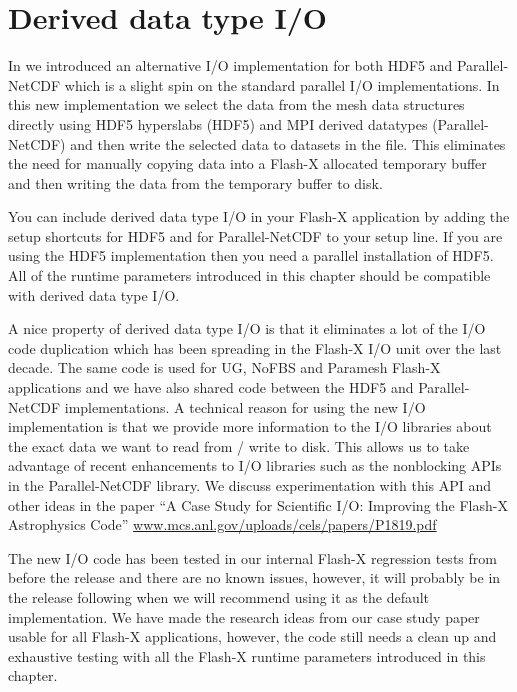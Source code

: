 \section{Derived data type I/O}

In \flashx we introduced an alternative I/O implementation for
both HDF5 and Parallel-NetCDF which is a slight spin on the standard
parallel I/O implementations.  In this new implementation we select
the data from the mesh data structures directly using HDF5 hyperslabs
(HDF5) and MPI derived datatypes (Parallel-NetCDF) and then write the
selected data to datasets in the file.  This eliminates the need for
manually copying data into a Flash-X allocated temporary buffer and then
writing the data from the temporary buffer to disk.

You can include derived data type I/O in your Flash-X application by
adding the setup shortcuts  for HDF5 and
 for Parallel-NetCDF to your setup line.  If you are
using the HDF5 implementation then you need a parallel installation of
HDF5.  All of the runtime parameters introduced in this chapter should
be compatible with derived data type I/O.

A nice property of derived data type I/O is that it eliminates a lot
of the I/O code duplication which has been spreading in the Flash-X I/O
unit over the last decade.  The same code is used for UG, NoFBS and
Paramesh Flash-X applications and we have also shared code between the
HDF5 and Parallel-NetCDF implementations.  A technical reason for
using the new I/O implementation is that we provide more information
to the I/O libraries about the exact data we want to read from / write
to disk.  This allows us to take advantage of recent enhancements to
I/O libraries such as the nonblocking APIs in the Parallel-NetCDF
library.  We discuss experimentation with this API and other ideas in
the paper ``A Case Study for Scientific I/O: Improving the Flash-X
Astrophysics Code''
\url{www.mcs.anl.gov/uploads/cels/papers/P1819.pdf}

The new I/O code has been tested in our internal Flash-X regression
tests from before the \flashx release and there are no known
issues, however, it will probably be in the release following
\flashx when we will recommend using it as the default
implementation.  We have made the research ideas from our case study
paper usable for all Flash-X applications, however, the code still needs
a clean up and exhaustive testing with all the Flash-X runtime
parameters introduced in this chapter.

